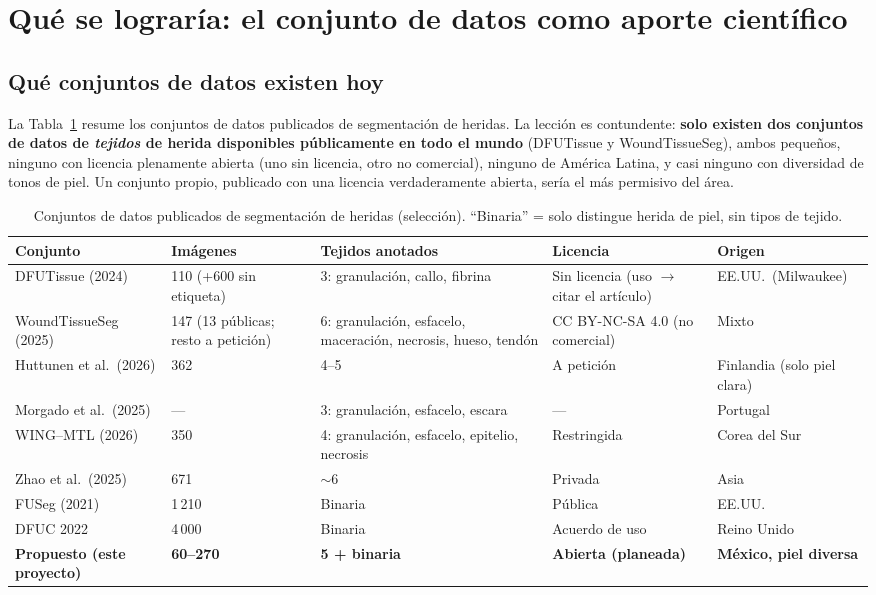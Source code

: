 \documentclass[12pt,letterpaper]{article}
\begin{document}
\section{Qué se lograría: el conjunto de datos como aporte científico}

\subsection{Qué conjuntos de datos existen hoy}

La Tabla~\ref{tab:datasets} resume los conjuntos de datos publicados de segmentación de heridas. La
lección es contundente: \textbf{solo existen dos conjuntos de datos de \emph{tejidos} de herida
disponibles públicamente en todo el mundo} (DFUTissue y WoundTissueSeg), ambos pequeños, ninguno
con licencia plenamente abierta (uno sin licencia, otro no comercial), ninguno de América Latina, y
casi ninguno con diversidad de tonos de piel. Un conjunto propio, publicado con una licencia
verdaderamente abierta, sería el más permisivo del área.

\begin{table}[H]
\centering
\footnotesize
\caption{Conjuntos de datos publicados de segmentación de heridas (selección). ``Binaria'' = solo
distingue herida de piel, sin tipos de tejido.}
\label{tab:datasets}
\renewcommand{\arraystretch}{1.3}
\begin{tabular}{@{}p{3.1cm}p{1.7cm}p{3.0cm}p{2.2cm}p{3.0cm}@{}}
\toprule
\textbf{Conjunto} & \textbf{Imágenes} & \textbf{Tejidos anotados} & \textbf{Licencia} & \textbf{Origen} \\
\midrule
DFUTissue (2024) & 110 (+600 sin etiqueta) & 3: granulación, callo, fibrina & Sin licencia (uso $\to$ citar el artículo) & EE.UU.\ (Milwaukee) \\
WoundTissueSeg (2025) & 147 (13 públicas; resto a petición) & 6: granulación, esfacelo, maceración, necrosis, hueso, tendón & CC BY-NC-SA 4.0 (no comercial) & Mixto \\
Huttunen et al.\ (2026) & 362 & 4--5 & A petición & Finlandia (solo piel clara) \\
Morgado et al.\ (2025) & --- & 3: granulación, esfacelo, escara & --- & Portugal \\
WING--MTL (2026) & 350 & 4: granulación, esfacelo, epitelio, necrosis & Restringida & Corea del Sur \\
Zhao et al.\ (2025) & 671 & $\sim$6 & Privada & Asia \\
\midrule
FUSeg (2021) & 1\,210 & Binaria & Pública & EE.UU. \\
DFUC 2022 & 4\,000 & Binaria & Acuerdo de uso & Reino Unido \\
\midrule
\textbf{Propuesto (este proyecto)} & \textbf{60--270} & \textbf{5 + binaria} & \textbf{Abierta (planeada)} & \textbf{México, piel diversa} \\
\bottomrule
\end{tabular}
\end{table}
\end{document}
